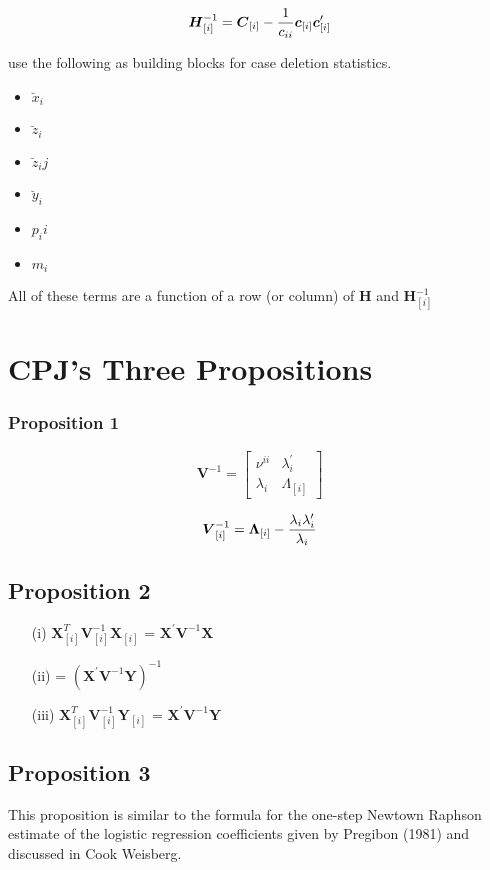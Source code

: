 \documentclass[Chap5amain.tex]{subfiles}
\begin{document}
\[ \boldsymbol{H}_{[i]}^{-1}  = \boldsymbol{C}_{[i]} - {1 \over c_{ii}}\boldsymbol{c}_{[i]}\boldsymbol{c}_{[i]}^{\prime} \]


\citet{CPJ} use the following as building blocks for case deletion statistics.
\begin{itemize}
	\item $\breve{x}_i$
	\item $\breve{z}_i$
	\item $\breve{z}_ij$
	\item $\breve{y}_i$
	\item $p_ii$
	\item $m_i$
\end{itemize}
All of these terms are a function of a row (or column) of $\boldsymbol{H}$ and $\boldsymbol{H}_{[i]}^{-1}$

\section{CPJ's Three Propositions} %


\subsubsection{Proposition 1}

\[
\boldsymbol{V}^{-1} =
\left[ \begin{array}{cc}
\nu^{ii} & \lambda_{i}^{\prime}  \\
\lambda_{i} & \Lambda_{[i]}
\end{array}\right] \]


\[\boldsymbol{V}_{[i]}^{-1} = \boldsymbol{\Lambda}_{[i]} - { \lambda_{i} \lambda_{i} ^{\prime} \over \lambda_{i} } \]

\subsection{Proposition 2}

\begin{itemize}
	\item[(i)] $ \boldsymbol{X}_{[i]}^{T}\boldsymbol{V}^{-1}_{[i]}\boldsymbol{X}_{[i]}$ = $\boldsymbol{X}^{\prime}\boldsymbol{V}^{-1}\boldsymbol{X}$
	\item[(ii)] = $(\boldsymbol{X}^{\prime}\boldsymbol{V}^{-1}\boldsymbol{Y})^{-1}$
	\item[(iii)] $ \boldsymbol{X}_{[i]}^{T}\boldsymbol{V}^{-1}_{[i]}\boldsymbol{Y}_{[i]}$ = $\boldsymbol{X}^{\prime}\boldsymbol{V}^{-1}\boldsymbol{Y}$
\end{itemize}
\subsection{Proposition 3}
This proposition is similar to the formula for the one-step Newtown Raphson estimate of the logistic regression coefficients given by Pregibon (1981) and discussed in Cook Weisberg.



\newpage
\end{document}
